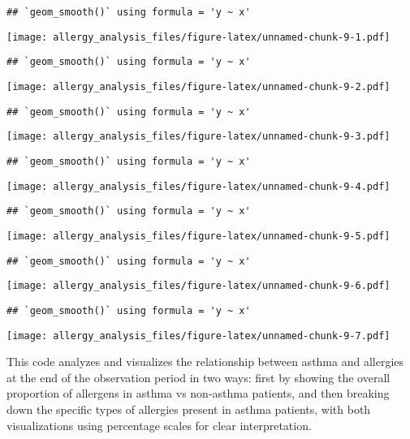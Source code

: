 \documentclass[
]{article}
\begin{document}
\begin{verbatim}
## `geom_smooth()` using formula = 'y ~ x'
\end{verbatim}

\texttt{[image: allergy\_analysis\_files/figure-latex/unnamed-chunk-9-1.pdf]}

\begin{verbatim}
## `geom_smooth()` using formula = 'y ~ x'
\end{verbatim}

\texttt{[image: allergy\_analysis\_files/figure-latex/unnamed-chunk-9-2.pdf]}

\begin{verbatim}
## `geom_smooth()` using formula = 'y ~ x'
\end{verbatim}

\texttt{[image: allergy\_analysis\_files/figure-latex/unnamed-chunk-9-3.pdf]}

\begin{verbatim}
## `geom_smooth()` using formula = 'y ~ x'
\end{verbatim}

\texttt{[image: allergy\_analysis\_files/figure-latex/unnamed-chunk-9-4.pdf]}

\begin{verbatim}
## `geom_smooth()` using formula = 'y ~ x'
\end{verbatim}

\texttt{[image: allergy\_analysis\_files/figure-latex/unnamed-chunk-9-5.pdf]}

\begin{verbatim}
## `geom_smooth()` using formula = 'y ~ x'
\end{verbatim}

\texttt{[image: allergy\_analysis\_files/figure-latex/unnamed-chunk-9-6.pdf]}

\begin{verbatim}
## `geom_smooth()` using formula = 'y ~ x'
\end{verbatim}

\texttt{[image: allergy\_analysis\_files/figure-latex/unnamed-chunk-9-7.pdf]}

This code analyzes and visualizes the relationship between asthma and
allergies at the end of the observation period in two ways: first by
showing the overall proportion of allergens in asthma vs non-asthma
patients, and then breaking down the specific types of allergies present
in asthma patients, with both visualizations using percentage scales for
clear interpretation.
\end{document}

